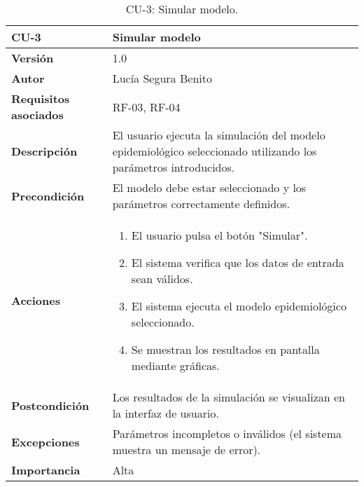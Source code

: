 \begin{table}[H]
\centering
\begin{tabular}{|p{3cm}|p{9cm}|}
\hline
\textbf{CU-3} & \textbf{Simular modelo} \\
\hline
\textbf{Versión} & 1.0 \\
\hline
\textbf{Autor} & Lucía Segura Benito \\
\hline
\textbf{Requisitos asociados} & RF-03, RF-04 \\
\hline
\textbf{Descripción} & El usuario ejecuta la simulación del modelo epidemiológico seleccionado utilizando los parámetros introducidos. \\
\hline
\textbf{Precondición} & El modelo debe estar seleccionado y los parámetros correctamente definidos. \\
\hline
\textbf{Acciones} &
\begin{enumerate}
    \item El usuario pulsa el botón "Simular".
    \item El sistema verifica que los datos de entrada sean válidos.
    \item El sistema ejecuta el modelo epidemiológico seleccionado.
    \item Se muestran los resultados en pantalla mediante gráficas.
\end{enumerate}
\\
\hline
\textbf{Postcondición} & Los resultados de la simulación se visualizan en la interfaz de usuario. \\
\hline
\textbf{Excepciones} & Parámetros incompletos o inválidos (el sistema muestra un mensaje de error). \\
\hline
\textbf{Importancia} & Alta \\
\hline
\end{tabular}
\caption{CU-3: Simular modelo.}
\label{tab:cu3}
\end{table}




